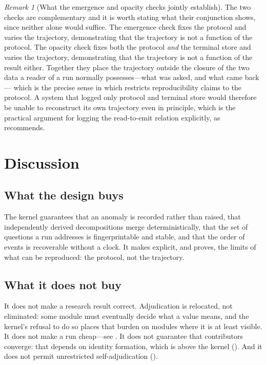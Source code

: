 \documentclass[11pt,a4paper]{article}
\theoremstyle{thmstyle}
\theoremstyle{definition}
\theoremstyle{remark}
\newtheorem{remark}[theorem]{Remark}
\begin{document}
\begin{remark}[What the emergence and opacity checks jointly establish]
\label{rem:joint}
The two checks are complementary and it is worth stating what their
conjunction shows, since neither alone would suffice. The emergence check
fixes the protocol and varies the trajectory, demonstrating that the
trajectory is not a function of the protocol. The opacity check fixes both
the protocol \emph{and} the terminal store and varies the trajectory,
demonstrating that the trajectory is not a function of the result either.
Together they place the trajectory outside the closure of the two data a
reader of a run normally possesses---what was asked, and what came back---
which is the precise sense in which  restricts
reproducibility claims to the protocol. A system that logged only protocol
and terminal store would therefore be unable to reconstruct its own
trajectory even in principle, which is the practical argument for logging
the read-to-emit relation explicitly, as  recommends.
\end{remark}

\section{Discussion}
\label{sec:discussion}

\subsection{What the design buys}

The kernel guarantees that an anomaly is recorded rather than raised, that
independently derived decompositions merge deterministically, that the set
of questions a run addresses is fingerprintable and stable, and that the
order of events is recoverable without a clock. It makes explicit, and
proves, the limits of what can be reproduced: the protocol, not the
trajectory.

\subsection{What it does not buy}

It does not make a research result correct. Adjudication is relocated, not
eliminated: some module must eventually decide what a value means, and the
kernel's refusal to do so places that burden on modules where it is at least
visible. It does not make a run cheap---see
. It does not guarantee that contributors converge:
that depends on identity formation, which is above the kernel
(). And it does not permit unrestricted self-adjudication
().
\end{document}
